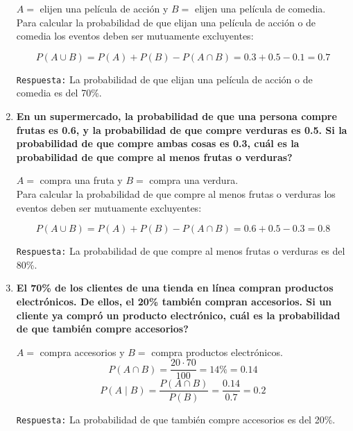 \documentclass[12pt]{article}
\begin{document}
\begin{enumerate}[label=\textbf{\arabic*.}]
        $A = $ elijen una película de acción y $B = $ elijen una película de comedia.\\

        Para calcular la probabilidad de que elijan una película de acción o de comedia  
        los eventos deben ser mutuamente excluyentes:

        \[P(A \cup B) = P(A) + P(B) - P(A \cap B) = 0.3 + 0.5 - 0.1 = 0.7\]

        \texttt{Respuesta:} La probabilidad de que elijan una película de acción o de comedia es del 70\%.



        \newpage
        \item \textbf{En un supermercado, la probabilidad de que una persona compre frutas es 0.6,
        y la probabilidad de que compre verduras es 0.5. Si la probabilidad de que
        compre ambas cosas es 0.3, \textquestiondown cuál es la probabilidad de que compre al menos
        frutas o verduras?}

        $A = $ compra una fruta y $B = $ compra una verdura.\\

        Para calcular la probabilidad de que compre al menos frutas o verduras 
        los eventos deben ser mutuamente excluyentes:

        \[P(A \cup B) = P(A) + P(B) - P(A \cap B) = 0.6 + 0.5 - 0.3 = 0.8\]

        \texttt{Respuesta:} La probabilidad de que compre al menos frutas o verduras es del 80\%.


        
        \item \textbf{El 70\% de los clientes de una tienda en línea compran productos electrónicos.
        De ellos, el 20\% también compran accesorios. Si un cliente ya compró un
        producto electrónico, \textquestiondown cuál es la probabilidad de que también compre
        accesorios?}

        $A = $ compra accesorios y $B = $ compra productos electrónicos.\\

        \[P(A \cap B) = \frac{20 \cdot 70}{100} = 14\% = 0.14\]
        \[P(A \mid B) = \frac{P(A \cap B)}{P(B)} = \frac{0.14}{0.7} = 0.2\]

        \texttt{Respuesta:} La probabilidad de que también compre accesorios es del 20\%.



\end{enumerate}
\end{document}
